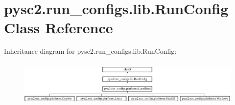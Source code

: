 \hypertarget{classpysc2_1_1run__configs_1_1lib_1_1_run_config}{}\section{pysc2.\+run\+\_\+configs.\+lib.\+Run\+Config Class Reference}
\label{classpysc2_1_1run__configs_1_1lib_1_1_run_config}
Inheritance diagram for pysc2.\+run\+\_\+configs.\+lib.\+Run\+Config\+:\begin{figure}[H]
\begin{center}
\leavevmode
\includegraphics[height=2.304527cm]{classpysc2_1_1run__configs_1_1lib_1_1_run_config}
\end{center}
\end{figure}
